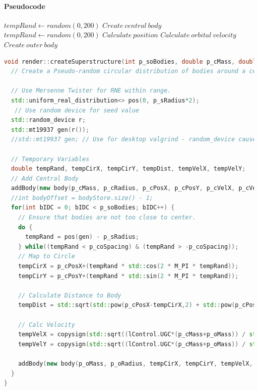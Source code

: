 \paragraph{Pseudocode}
\begin{algorithmic}[1]\STATE $tempRand \leftarrow random(0, 200)$
\STATE $Create~central~body$
  \STATE $tempRand \leftarrow random(0, 200)$
  \STATE $Calculate~position$
  \STATE $Calculate~orbital~velocity$ 
  \STATE $Create~outer~body$
\ENDFOR
\end{algorithmic}
\pagebreak
\begin{lstlisting}[language=c++]
void render::createSuperstructure(int p_soBodies, double p_cMass, double p_oMass, double p_cRadius, double p_oRadius, double p_cPosX, double p_cPosY, double p_cVelX, double p_cVelY, double p_coSpacing, double p_sRadius, float p_color[3]) {
  // Create a Pseudo-random circular distribution of bodies around a central body.

  // Use Mersenne Twister for RNE within range.
  std::uniform_real_distribution<> pos(0, p_sRadius*2);
   // Use random device for seed value
  std::random_device r;
  std::mt19937 gen(r());
  //std::mt19937 gen; // Use for desktop valgrind - random_device causes segfault

  // Temporary Variables
  double tempRand, tempCirX, tempCirY, tempDist, tempVelX, tempVelY;
  // Add Central Body
  addBody(new body(p_cMass, p_cRadius, p_cPosX, p_cPosY, p_cVelX, p_cVelY, p_color));
  //int bodyOffset = bodyStore.size() - 1;
  for(int bIDC = 0; bIDC < p_soBodies; bIDC++) {
    // Ensure that bodies are not too close to center.
    do {
      tempRand = pos(gen) - p_sRadius;
    } while((tempRand < p_coSpacing) & (tempRand > -p_coSpacing));
    // Map to Circle
    tempCirX = p_cPosX+(tempRand * std::cos(2 * M_PI * tempRand));
    tempCirY = p_cPosY+(tempRand * std::sin(2 * M_PI * tempRand));

    // Calculate Distance to Body
    tempDist = std::sqrt(std::pow(p_cPosX-tempCirX,2) + std::pow(p_cPosY-tempCirY,2));

    // Calc Velocity
    tempVelX = copysign(std::sqrt((lControl.UGC*(p_cMass+p_oMass)) / std::pow(tempDist,3)) * (tempCirY-p_cPosY), (tempCirY-p_cPosY)) + p_cVelX;
    tempVelY = copysign(std::sqrt((lControl.UGC*(p_cMass+p_oMass)) / std::pow(tempDist,3)) * (tempCirX-p_cPosX), -(tempCirX-p_cPosX)) + p_cVelY;

    addBody(new body(p_oMass, p_oRadius, tempCirX, tempCirY, tempVelX, tempVelY, p_color));
  }
}
\end{lstlisting}

